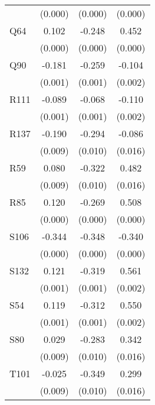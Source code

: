 \begin{table}[htbp]
\begin{tabular}{l*{3}{c}}
                &  (0.000)         &  (0.000)         &  (0.000)         \\
Q64             &    0.102\sym{***}&   -0.248\sym{***}&    0.452\sym{***}\\
                &  (0.000)         &  (0.000)         &  (0.000)         \\
Q90             &   -0.181\sym{***}&   -0.259\sym{***}&   -0.104\sym{***}\\
                &  (0.001)         &  (0.001)         &  (0.002)         \\
R111            &   -0.089\sym{***}&   -0.068\sym{***}&   -0.110\sym{***}\\
                &  (0.001)         &  (0.001)         &  (0.002)         \\
R137            &   -0.190\sym{***}&   -0.294\sym{***}&   -0.086\sym{***}\\
                &  (0.009)         &  (0.010)         &  (0.016)         \\
R59             &    0.080\sym{***}&   -0.322\sym{***}&    0.482\sym{***}\\
                &  (0.009)         &  (0.010)         &  (0.016)         \\
R85             &    0.120\sym{***}&   -0.269\sym{***}&    0.508\sym{***}\\
                &  (0.000)         &  (0.000)         &  (0.000)         \\
S106            &   -0.344\sym{***}&   -0.348\sym{***}&   -0.340\sym{***}\\
                &  (0.000)         &  (0.000)         &  (0.000)         \\
S132            &    0.121\sym{***}&   -0.319\sym{***}&    0.561\sym{***}\\
                &  (0.001)         &  (0.001)         &  (0.002)         \\
S54             &    0.119\sym{***}&   -0.312\sym{***}&    0.550\sym{***}\\
                &  (0.001)         &  (0.001)         &  (0.002)         \\
S80             &    0.029\sym{***}&   -0.283\sym{***}&    0.342\sym{***}\\
                &  (0.009)         &  (0.010)         &  (0.016)         \\
T101            &   -0.025\sym{***}&   -0.349\sym{***}&    0.299\sym{***}\\
                &  (0.009)         &  (0.010)         &  (0.016)         \\

\end{tabular}
\end{table}

